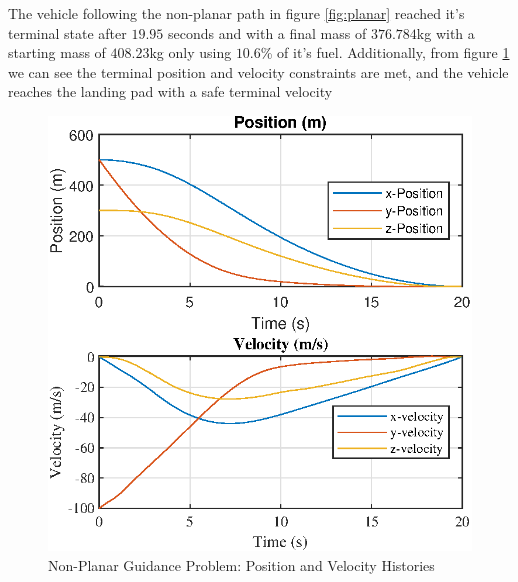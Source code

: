 The vehicle following the non-planar path in figure \ref{fig:planar} reached it's terminal state after $19.95$ seconds and with a final mass of $376.784$kg with a starting mass of $408.23$kg only using $10.6$\% of it's fuel. Additionally, from figure \ref{fig:nplanar_rv} we can see the terminal position and velocity constraints are met, and the vehicle reaches the landing pad with a safe terminal velocity
\begin{figure}[ht] 
  \centering
  \includegraphics[width=.5\linewidth]{figs/nonplanar_rv.eps}
  \caption{Non-Planar Guidance Problem: Position and Velocity Histories}
  \label{fig:nplanar_rv}
\end{figure}
